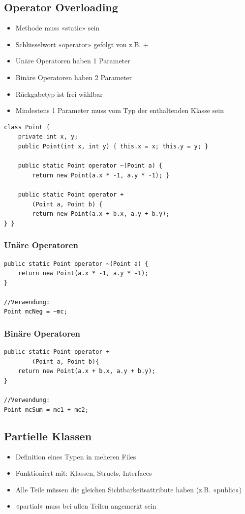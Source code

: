 \subsection{Operator Overloading}
\begin{itemize}
    \item Methode muss «static» sein
    \item Schlüsselwort «operator» gefolgt von z.B. +
    \item Unäre Operatoren haben 1 Parameter
    \item Binäre Operatoren haben 2 Parameter
    \item Rückgabetyp ist frei wählbar
    \item Mindestens 1 Parameter muss vom Typ der enthaltenden Klasse sein
\end{itemize}

\begin{lstlisting}
class Point {
    private int x, y;
    public Point(int x, int y) { this.x = x; this.y = y; }

    public static Point operator ~(Point a) {
        return new Point(a.x * -1, a.y * -1); }

    public static Point operator +
        (Point a, Point b) {
        return new Point(a.x + b.x, a.y + b.y);
} }
\end{lstlisting}
\subsubsection{Unäre Operatoren}
\begin{lstlisting}
public static Point operator ~(Point a) {
    return new Point(a.x * -1, a.y * -1);
}

//Verwendung:
Point mcNeg = ~mc;
\end{lstlisting}
\subsubsection{Binäre Operatoren}
\begin{lstlisting}
public static Point operator +
        (Point a, Point b){
    return new Point(a.x + b.x, a.y + b.y);
}

//Verwendung:
Point mcSum = mc1 + mc2;
\end{lstlisting}

\subsection{Partielle Klassen}
\begin{itemize}
    \item Definition eines Typen in meheren Files
    \item Funktioniert mit: Klassen, Structs, Interfaces
    \item Alle Teile müssen die gleichen Sichtbarkeitsattribute haben (z.B. «public»)
    \item «partial» muss bei allen Teilen angemerkt sein
\end{itemize}

